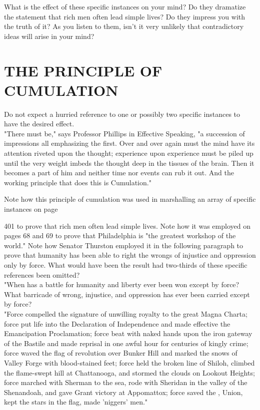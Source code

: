 \documentclass[10pt]{article}
\begin{document}
What is the effect of these specific instances on your mind? Do they dramatize the statement that rich men often lead simple lives? Do they impress you with the truth of it? As you listen to them, isn't it very unlikely that contradictory ideas will arise in your mind?

\section*{THE PRINCIPLE OF CUMULATION}
Do not expect a hurried reference to one or possibly two specific instances to have the desired effect.\\
"There must be," says Professor Phillips in Effective Speaking, "a succession of impressions all emphasizing the first. Over and over again must the mind have its attention riveted upon the thought; experience upon experience must be piled up until the very weight imbeds the thought deep in the tissues of the brain. Then it becomes a part of him and neither time nor events can rub it out. And the working principle that does this is Cumulation."

Note how this principle of cumulation was used in marshalling an array of specific instances on page

401 to prove that rich men often lead simple lives. Note how it was employed on pages 68 and 69 to prove that Philadelphia is "the greatest workshop of the world." Note how Senator Thurston employed it in the following paragraph to prove that humanity has been able to right the wrongs of injustice and oppression only by force. What would have been the result had two-thirds of these specific references been omitted?\\
"When has a battle for humanity and liberty ever been won except by force? What barricade of wrong, injustice, and oppression has ever been carried except by force?\\
"Force compelled the signature of unwilling royalty to the great Magna Charta; force put life into the Declaration of Independence and made effective the Emancipation Proclamation; force beat with naked hands upon the iron gateway of the Bastile and made reprisal in one awful hour for centuries of kingly crime; force waved the flag of revolution over Bunker Hill and marked the snows of Valley Forge with blood-stained feet; force held the broken line of Shiloh, climbed the flame-swept hill at Chattanooga, and stormed the clouds on Lookout Heights; force marched with Sherman to the sea, rode with Sheridan in the valley of the Shenandoah, and gave Grant victory at Appomattox; force saved the , Union, kept the stars in the flag, made 'niggers' men."
\end{document}
